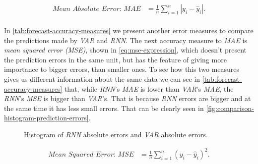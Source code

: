 \begin{equation}
  \begin{aligned}
    \label{eq:mae-expression}
    \textit{Mean Absolute Error: MAE} & =
    \frac{1}{n} \sum_{i=1}^{n} |y_i - \hat{y}_i|.\\
  \end{aligned}
\end{equation}

In \autoref{tab:forecast-accuracy-measures} we present another error
measures to compare the predictions made by \textit{VAR} and
\textit{RNN}. The next accuracy measure to \textit{MAE} is
\textit{mean squared error (MSE)}, shown in
\autoref{eq:mse-expression}, which doesn't present the prediction
errors in the same unit, but has the feature of giving more importance
to bigger errors, than smaller ones. To see how this two measures
gives us different information about the same data we can see in
\autoref{tab:forecast-accuracy-measures} that, while \textit{RNN}'s
\textit{MAE} is lower than \textit{VAR}'s \textit{MAE}, the
\textit{RNN}'s \textit{MSE} is bigger than \textit{VAR}'s. That is
because \textit{RNN} errors are bigger and at the same time it has
less small errors. That can be clearly seen in
\autoref{fig:comparison-histogram-prediction-errors}.

\begin{figure}[bth]
  \caption{Histogram of \textit{RNN} absolute errors and \textit{VAR}
    absolute errors.}
  \label{fig:comparison-histogram-prediction-errors}
\end{figure}

\begin{equation}
  \begin{aligned}
    \label{eq:mse-expression}
    \textit{Mean Squared Error: MSE} & = \frac{1}{n} \sum_{i=1}^{n}
    (y_i - \hat{y}_i)^2.\\
  \end{aligned}
\end{equation}

